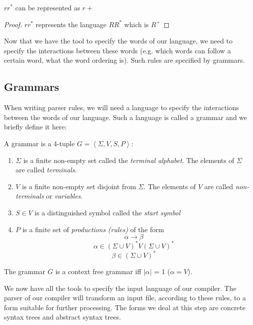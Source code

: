 \begin{thm}
  $r r^*$ can be represented as $r+$
\end{thm}

\begin{proof}
  $r r^*$ represents the language $R R^*$ which is $R^+$
\end{proof}

Now that we have the tool to specify the words of our language, we
need to specify the interactions between these words (e.g. which words
can follow a certain word, what the word ordering is). Such rules are
specified by grammars.

\subsection{Grammars}

When writing parser rules, we will need a language to specify the
interactions between the words of our language. Such a language
is called a grammar and we briefly define it here:

\begin{defn}[Grammar]
  A grammar is a 4-tuple $G = \left< \Sigma, V, S, P \right>$:
  \begin{enumerate}
  \item $\Sigma$ is a finite non-empty set called the \emph{terminal
    alphabet}. The elements of $\Sigma$ are called \emph{terminals}.
  \item $V$ is a finite non-empty set disjoint from $\Sigma$. The
    elements of $V$ are called \emph{non-terminals} or \emph{variables}.
  \item $S \in V$ is a distinguished symbol called the \emph{start symbol}
  \item $P$ is a finite set of \emph{productions (rules)} of the form
    $$ \alpha \rightarrow \beta $$
    $$ \alpha \in (\Sigma \cup V)^* V (\Sigma \cup V)^* $$
    $$ \beta \in (\Sigma \cup V)^* $$
  \end{enumerate}
\end{defn}

\begin{defn}
  The grammar $G$ is a context free grammar iff $|\alpha|$ = 1 ($\alpha = V$).
\end{defn}

We now have all the tools to specify the input language of our
compiler. The parser of our compiler will transform an input file,
according to these rules, to a form suitable for further
processing. The forms we deal at this step are concrete syntax trees
and abstract syntax trees.

